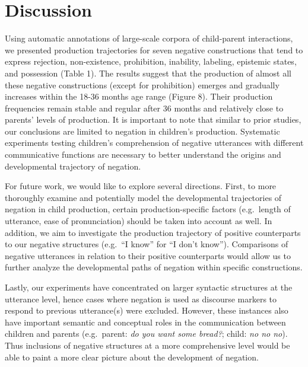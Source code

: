 \documentclass[
  english,
  man,floatsintext]{apa6}
\begin{document}
\hypertarget{discussion}{%
\section{Discussion}\label{discussion}}

Using automatic annotations of large-scale corpora of child-parent interactions, we presented production trajectories for seven negative constructions that tend to express rejection, non-existence, prohibition, inability, labeling, epistemic states, and possession (Table 1). The results suggest that the production of almost all these negative constructions (except for prohibition) emerges and gradually increases within the 18-36 months age range (Figure 8). Their production frequencies remain stable and regular after 36 months and relatively close to parents' levels of production. It is important to note that similar to prior studies, our conclusions are limited to negation in children's production. Systematic experiments testing children's comprehension of negative utterances with different communicative functions are necessary to better understand the origins and developmental trajectory of negation.

For future work, we would like to explore several directions. First, to more thoroughly examine and potentially model the developmental trajectories of negation in child production, certain production-specific factors (e.g.~length of utterance, ease of pronunciation) should be taken into account as well. In addition, we aim to investigate the production trajectory of positive counterparts to our negative structures (e.g.~``I know'' for ``I don't know''). Comparisons of negative utterances in relation to their positive counterparts would allow us to further analyze the developmental paths of negation within specific constructions.

Lastly, our experiments have concentrated on larger syntactic structures at the utterance level, hence cases where negation is used as discourse markers to respond to previous utterance(s) were excluded. However, these instances also have important semantic and conceptual roles in the communication between children and parents (e.g.~parent: \emph{do you want some bread?}; child: \emph{no no no}). Thus inclusions of negative structures at a more comprehensive level would be able to paint a more clear picture about the development of negation.

\begingroup
\setlength{\parindent}{-0.5in}
\setlength{\leftskip}{0.5in}
\end{document}
